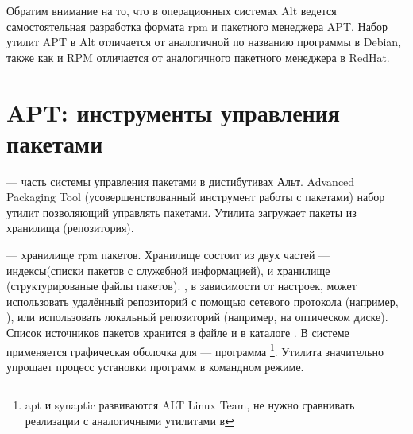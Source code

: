 Обратим внимание на то, что в операционных системах Alt ведется самостоятельная
разработка формата rpm и пакетного менеджера APT. Набор утилит APT в Alt отличается
от аналогичной по названию программы в Debian, также как и RPM отличается от
аналогичного пакетного менеджера в RedHat.

\section{APT: инструменты управления пакетами}
 --- часть системы управления пакетами в дистибутивах Альт. Advanced Packaging Tool
(усовершенствованный инструмент работы с пакетами) набор утилит позволяющий управлять пакетами.
Утилита загружает пакеты из хранилища (репозитория).

 ---  хранилище rpm пакетов. Хранилище состоит из
двух частей --- индексы(списки пакетов с служебной информацией), и хранилище (структурированые файлы пакетов).
 , в зависимости от настроек, может использовать удалённый репозиторий
с помощью сетевого протокола (например, ), или использовать локальный репозиторий (например,
на оптическом диске).
Список источников пакетов хранится в файле
 и в каталоге . В системе  
применяется графическая оболочка для  --- программа \footnote{apt и synaptic 
развиваются ALT Linux Team, не нужно сравнивать реализации с аналогичными утилитами в }.
Утилита  значительно упрощает процесс установки программ в командном режиме.


